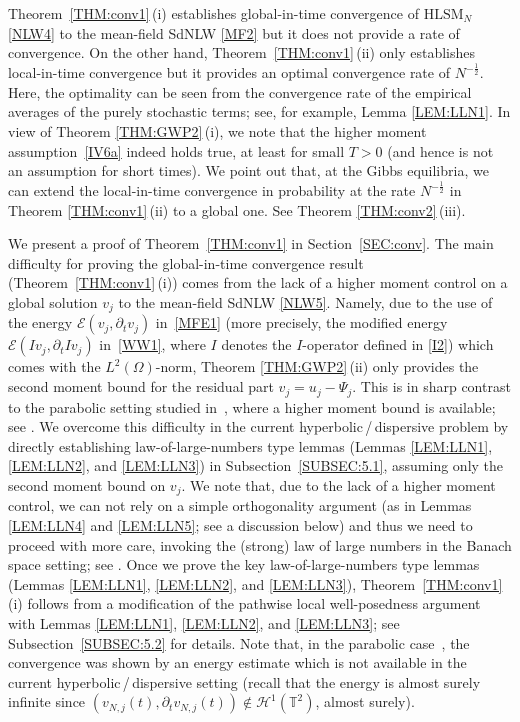 \documentclass[letterpaper, 11pt,  reqno]{amsart}
\newcommand{\1}{\hspace{0.5mm}\text{I}\hspace{0.2mm}}
\newcommand{\T}{\mathbb{T}}
\renewcommand{\H}{\mathcal{H}}
\newcommand{\dt}{\partial_t}
\newcommand{\EE}{\mathcal{E}}
\newcommand{\HLS}{$\text{HLSM}_N$ }
\renewcommand{\O}{\Omega}
\numberwithin{equation}{section}
\numberwithin{theorem}{section}
\begin{document}
Theorem~\ref{THM:conv1}\,(i)
establishes global-in-time convergence
of \HLS \eqref{NLW4} to the mean-field SdNLW
\eqref{MF2}
but it does not provide a rate of convergence.
On the other hand, 
Theorem~\ref{THM:conv1}\,(ii)
only establishes local-in-time convergence
but it provides an optimal  convergence rate of $N^{- \frac12}$.
Here, the optimality can be seen from the convergence
rate of the empirical averages
of the purely stochastic terms; see, for example,  Lemma \ref{LEM:LLN1}.
In view of Theorem \ref{THM:GWP2}\,(i), 
we note that 
 the higher moment assumption~\eqref{IV6a}
indeed holds true, at least for small $T > 0$
(and hence is not an assumption
for short times).
We point out that, at the Gibbs equilibria, 
we can extend the  local-in-time convergence in probability 
at the rate $N^{-\frac 12}$
in Theorem \ref{THM:conv1}\,(ii)
to a global one.
See Theorem \ref{THM:conv2}\,(iii).

We present a proof of 
Theorem~\ref{THM:conv1} in Section~\ref{SEC:conv}. 
The main difficulty for proving 
the global-in-time convergence result (Theorem~\ref{THM:conv1}\,(i))
comes from the lack of a higher moment control
on a global solution $v_j$ 
to the mean-field SdNLW \eqref{NLW5}.
Namely, 
due to the use of the energy $\EE(v_j, \dt v_j)$ in~\eqref{MFE1}
(more precisely, the modified energy
$\EE(Iv_j, \dt I v_j)$ in~\eqref{WW1}, 
where $I$ denotes the $I$-operator defined in \eqref{I2})
which comes with the $L^2(\O)$-norm, 
Theorem \ref{THM:GWP2}\,(ii)
only provides  the second moment bound
for the residual part $v_j = u_j - \Psi_j$.
This is in sharp contrast to the 
 parabolic setting studied in~\cite{SSZZ},
 where a higher moment bound
 is available;
see \cite[Lemma~3.4]{SSZZ}.
We overcome this difficulty 
in the current hyperbolic\,/\,dispersive problem
by directly establishing 
 law-of-large-numbers type lemmas
 (Lemmas \ref{LEM:LLN1}, \ref{LEM:LLN2}, and \ref{LEM:LLN3})
in Subsection~\ref{SUBSEC:5.1}, 
assuming only the second moment bound on $v_j$.
We note that, due to the lack of a higher moment control, 
we can not rely on a simple orthogonality argument (as in Lemmas \ref{LEM:LLN4} and \ref{LEM:LLN5};
see a discussion below)
and thus we need to proceed with more care, 
  invoking the (strong) law of large numbers
in the Banach space setting; see \cite[Chapter 7]{LT}.
Once we prove
the key 
 law-of-large-numbers type lemmas
(Lemmas \ref{LEM:LLN1}, \ref{LEM:LLN2}, and \ref{LEM:LLN3}), 
Theorem~\ref{THM:conv1}\,(i)
follows from 
a modification of the pathwise local well-posedness
argument 
with Lemmas \ref{LEM:LLN1}, \ref{LEM:LLN2}, and \ref{LEM:LLN3};
see Subsection~\ref{SUBSEC:5.2} for details.
Note that, in the parabolic case~\cite{SSZZ}, 
the convergence was shown by 
an energy estimate
which is not available
in the current hyperbolic\,/\,dispersive setting
(recall that  the energy is almost surely infinite
since $(v_{N, j}(t), \dt v_{N, j}(t)) \notin \H^1(\T^2)$, 
almost surely).
\end{document}
